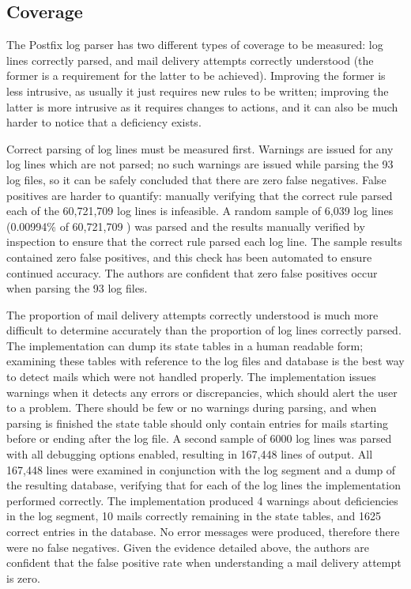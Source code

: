 \documentclass{svmult}
\newcommand{\numberOFlogFILES}[0]{%
    93%
}
\newcommand{\numberOFlogLINES}[0]{%
    60,721,709%
}
\begin{document}
\subsection{Coverage}

\label{coverage}

The Postfix log parser has two different types of coverage to be measured:
log lines correctly parsed, and mail delivery attempts correctly understood
(the former is a requirement for the latter to be achieved).  Improving the
former is less intrusive, as usually it just requires new rules to be
written; improving the latter is more intrusive as it requires changes to
actions, and it can also be much harder to notice that a deficiency exists.

Correct parsing of log lines must be measured first.  Warnings are issued
for any log lines which are not parsed; no such warnings are issued while
parsing the \numberOFlogFILES{} log files, so it can be safely concluded
that there are zero false negatives.  False positives are harder to
quantify: manually verifying that the correct rule parsed each of the
\numberOFlogLINES{} log lines is infeasible.  A random sample of 6,039 log
lines (0.00994\% of \numberOFlogLINES{}) was parsed and the results
manually verified by inspection to ensure that the correct rule parsed each
log line.  The sample results contained zero false positives, and this
check has been automated to ensure continued accuracy.  The authors are
confident that zero false positives occur when parsing the
\numberOFlogFILES{} log files.

The proportion of mail delivery attempts correctly understood is much more
difficult to determine accurately than the proportion of log lines
correctly parsed.  The implementation can dump its state tables in a human
readable form; examining these tables with reference to the log files and
database is the best way to detect mails which were not handled properly.
The implementation issues warnings when it detects any errors or
discrepancies, which should alert the user to a problem.  There should be
few or no warnings during parsing, and when parsing is finished the state
table should only contain entries for mails starting before or ending after
the log file.  A second sample of 6000 log lines was parsed with all
debugging options enabled, resulting in 167,448 lines of output.  All
167,448 lines were examined in conjunction with the log segment and a dump
of the resulting database, verifying that for each of the log lines the
implementation performed correctly.  The implementation produced 4 warnings
about deficiencies in the log segment, 10 mails correctly remaining in the
state tables, and 1625 correct entries in the database.  No error messages
were produced, therefore there were no false negatives.  Given the evidence
detailed above, the authors are confident that the false positive rate when
understanding a mail delivery attempt is zero.
\end{document}
